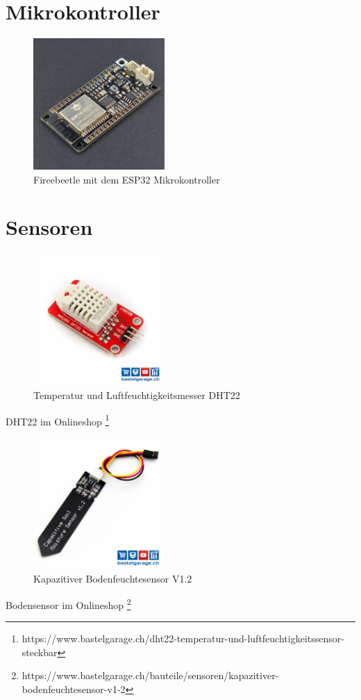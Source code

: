 \documentclass[
  10pt, %
  a4paper, %
  twoside, %
  openright, %
  numbers=noenddot, %
  BCOR=5mm, %
  parskip=half*, %
  thesis, %
]{bfhbook}
\begin{document}
\section{Mikrokontroller}
\begin{figure}[htp]
  \begin{center}
    \includegraphics[width=5cm, left]{Bilder/Firebeetle.jpg}
  \end{center}
    \caption{Fireebeetle mit dem ESP32 Mikrokontroller}
  \label{fig:test1}
\end{figure}

 \section{Sensoren}
 \begin{figure}[htp]
  \begin{center}
    \includegraphics[width=5cm, left]{Bilder/DHT22.jpg}
  \end{center}
    \caption{Temperatur und Luftfeuchtigkeitsmesser DHT22}
  \label{fig:dht22}
\end{figure}
DHT22 im Onlineshop \footnote{https://www.bastelgarage.ch/dht22-temperatur-und-luftfeuchtigkeitssensor-steckbar}

 \begin{figure}[htp]
  \begin{center}
    \includegraphics[width=5cm, left]{Bilder/Soil-2.jpg}
  \end{center}
    \caption{Kapazitiver Bodenfeuchtesensor V1.2}
  \label{fig:soil1.2}
\end{figure}
Bodensensor im Onlineshop \footnote{https://www.bastelgarage.ch/bauteile/sensoren/kapazitiver-bodenfeuchtesensor-v1-2}
\end{document}
